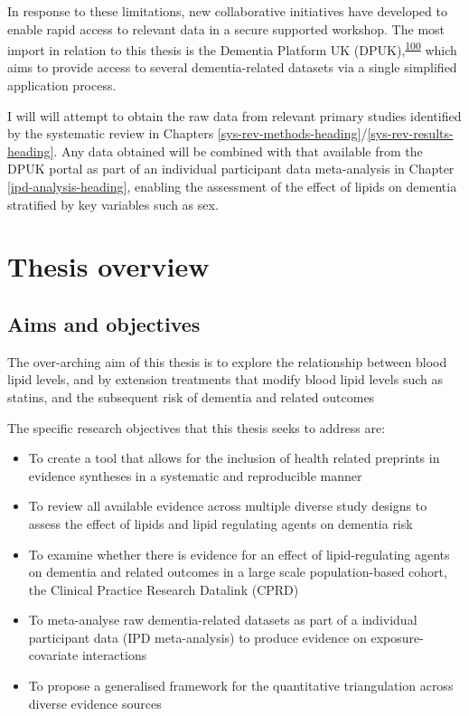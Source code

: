\documentclass[a4paper, twoside]{templates/ociamthesis}
\providecommand{\tightlist}{%
  \setlength{\itemsep}{0pt}\setlength{\parskip}{0pt}}
\begin{document}
In response to these limitations, new collaborative initiatives have developed to enable rapid access to relevant data in a secure supported workshop. The most import in relation to this thesis is the Dementia Platform UK (DPUK),\textsuperscript{\protect\hyperlink{ref-bauermeister2020}{100}} which aims to provide access to several dementia-related datasets via a single simplified application process.

I will will attempt to obtain the raw data from relevant primary studies identified by the systematic review in Chapters \ref{sys-rev-methods-heading}/\ref{sys-rev-results-heading}. Any data obtained will be combined with that available from the DPUK portal as part of an individual participant data meta-analysis in Chapter \ref{ipd-analysis-heading}, enabling the assessment of the effect of lipids on dementia stratified by key variables such as sex.

\hypertarget{background-thesis-overview}{%
\section{Thesis overview}\label{background-thesis-overview}}

\hypertarget{aims-and-objectives}{%
\subsection{Aims and objectives}\label{aims-and-objectives}}

The over-arching aim of this thesis is to explore the relationship between blood lipid levels, and by extension treatments that modify blood lipid levels such as statins, and the subsequent risk of dementia and related outcomes

The specific research objectives that this thesis seeks to address are:

\begin{itemize}
\tightlist
\item
  To create a tool that allows for the inclusion of health related preprints in evidence syntheses in a systematic and reproducible manner
\item
  To review all available evidence across multiple diverse study designs to assess the effect of lipids and lipid regulating agents on dementia risk
\item
  To examine whether there is evidence for an effect of lipid-regulating agents on dementia and related outcomes in a large scale population-based cohort, the Clinical Practice Research Datalink (CPRD)
\item
  To meta-analyse raw dementia-related datasets as part of a individual participant data (IPD meta-analysis) to produce evidence on exposure-covariate interactions
\item
  To propose a generalised framework for the quantitative triangulation across diverse evidence sources
\end{itemize}
\end{document}
